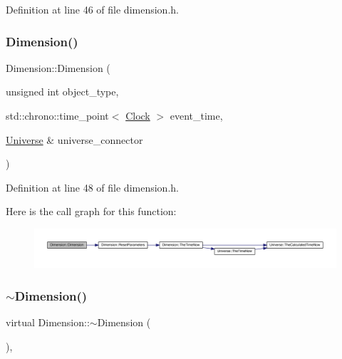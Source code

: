 Definition at line 46 of file dimension.\+h.

\mbox{\label{class_dimension_a9282c4669e8f97dce010324886d79a99}} 
\subsubsection{\texorpdfstring{Dimension()}{Dimension()}\hspace{0.1cm}{\footnotesize\ttfamily [4/4]}}
{\footnotesize\ttfamily Dimension\+::\+Dimension (\begin{DoxyParamCaption}\item[{unsigned int}]{object\+\_\+type,  }\item[{std\+::chrono\+::time\+\_\+point$<$ \hyperlink{universe_8h_a0ef8d951d1ca5ab3cfaf7ab4c7a6fd80}{Clock} $>$}]{event\+\_\+time,  }\item[{\hyperlink{class_universe}{Universe} \&}]{universe\+\_\+connector }\end{DoxyParamCaption})\hspace{0.3cm}{\ttfamily [inline]}}



Definition at line 48 of file dimension.\+h.

Here is the call graph for this function\+:
\nopagebreak
\begin{figure}[H]
\begin{center}
\leavevmode
\includegraphics[width=350pt]{class_dimension_a9282c4669e8f97dce010324886d79a99_cgraph}
\end{center}
\end{figure}
\mbox{\label{class_dimension_aa990dfd442020c193a1941e9dffbfbee}} 
\subsubsection{\texorpdfstring{$\sim$\+Dimension()}{~Dimension()}}
{\footnotesize\ttfamily virtual Dimension\+::$\sim$\+Dimension (\begin{DoxyParamCaption}{ }\end{DoxyParamCaption})\hspace{0.3cm}{\ttfamily [inline]}, {\ttfamily [virtual]}}



